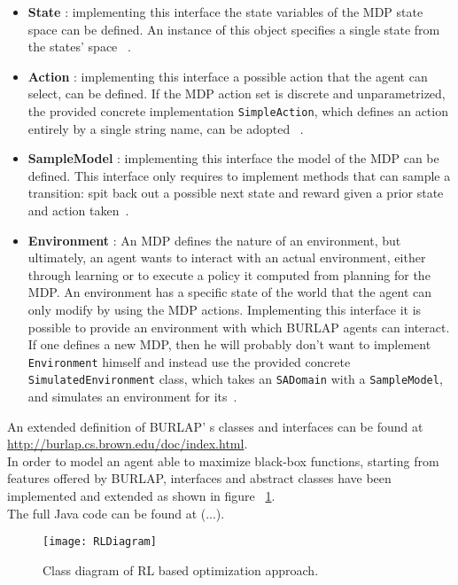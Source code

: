 \begin{itemize}
	\item \textbf{State} : implementing this interface the state variables of the MDP state space can be defined. An instance of this object specifies a single state from the states' space~\cite{BURLAPSite} .
	\item \textbf{Action} : implementing this interface a possible action that the agent can select, can be defined. If the MDP action set is discrete and unparametrized, the provided concrete implementation {\tt SimpleAction}, which defines an action entirely by a single string name, can be adopted ~\cite{BURLAPSite}.
	\item \textbf{SampleModel} : implementing this interface the model of the MDP can be defined. This interface only requires to implement methods that can sample a transition: spit back out a possible next state and reward given a prior state and action taken~\cite{BURLAPSite}.
	\item  \textbf{Environment} : An MDP defines the nature of an environment, but ultimately, an agent wants to interact with an actual environment, either through learning or to execute a policy it computed from planning for the MDP. An environment has a specific state of the world that the agent can only modify by using the MDP actions. Implementing this interface it is possible to provide an environment with which BURLAP agents can interact. If one defines a new MDP, then he will probably don't want to implement {\tt Environment} himself and instead use the provided concrete {\tt SimulatedEnvironment} class, which takes an {\tt SADomain} with a {\tt SampleModel}, and simulates an environment for its~\cite{BURLAPSite}.
\end{itemize}

An extended definition of BURLAP' s classes and interfaces can be found at \url{http://burlap.cs.brown.edu/doc/index.html}. \\

In order to model an agent able to maximize black-box functions, starting from features offered by BURLAP, interfaces and abstract classes have been implemented and extended as shown in figure ~\ref{fig:RLUMLDiagram}. \\

The full Java code can be found at (...).

\begin{figure} [h!]
	\texttt{[image: RLDiagram]}
	\caption{Class diagram of RL based optimization approach.}
	\label{fig:RLUMLDiagram}
\end{figure}

